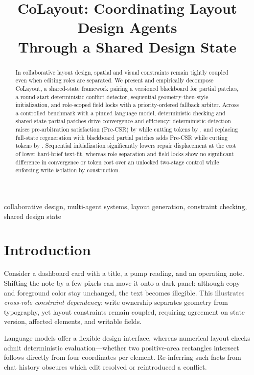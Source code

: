 \documentclass[conference]{IEEEtran}
\title{CoLayout: Coordinating Layout Design Agents\\Through a Shared Design State}
\author{\IEEEauthorblockN{\CoLayoutAuthorNames}
  \IEEEauthorblockA{\textit{Affiliation withheld for double-blind review}\\
    \textit{Location withheld}\\
    Contact withheld}
}
\author{\IEEEauthorblockN{\CoLayoutAuthorNames}
  \IEEEauthorblockA{\textit{Department of Industrial Design}\\
    \textit{Faculty of Design, University of Macau}\\
    Macao SAR, China\\
    yukai.zhou@connect.um.edu.mo}
}
\begin{document}
\maketitle

\begin{abstract}
In collaborative layout design, spatial and visual constraints remain tightly
coupled even when editing roles are separated. We present and empirically
decompose CoLayout, a shared-state framework pairing a versioned blackboard for
partial patches, a round-start deterministic conflict detector, sequential
geometry-then-style initialization, and role-scoped field locks with a
priority-ordered fallback arbiter. Across a controlled benchmark with a pinned
language model, deterministic checking and shared-state partial patches drive
convergence and efficiency: deterministic detection raises pre-arbitration
satisfaction (Pre-CSR) by \vDPreDet{} while cutting tokens by \vTokCutDetPct{},
and replacing full-state regeneration with blackboard partial patches adds
\vDPreBB{} Pre-CSR while cutting tokens by \vTokCutBBPct{}. Sequential
initialization significantly lowers repair displacement at the cost of lower
hard-brief text-fit, whereas role separation and field locks show no significant
difference in convergence or token cost over an unlocked two-stage control while
enforcing write isolation by construction.
\end{abstract}
\begin{IEEEkeywords}
collaborative design, multi-agent systems, layout generation, constraint checking,
shared design state
\end{IEEEkeywords}

\section{Introduction}
Consider a dashboard card with a title, a pump reading, and an operating note.
Shifting the note by a few pixels can move it onto a dark panel: although copy
and foreground color stay unchanged, the text becomes illegible. This
illustrates \emph{cross-role constraint dependency}: write ownership separates
geometry from typography, yet layout constraints remain coupled, requiring
agreement on state version, affected elements, and writable fields.

Language models offer a flexible design interface, whereas numerical layout
checks admit deterministic evaluation---whether two positive-area rectangles
intersect follows directly from four coordinates per element. Re-inferring such
facts from chat history obscures which edit resolved or reintroduced a conflict.
\end{document}
